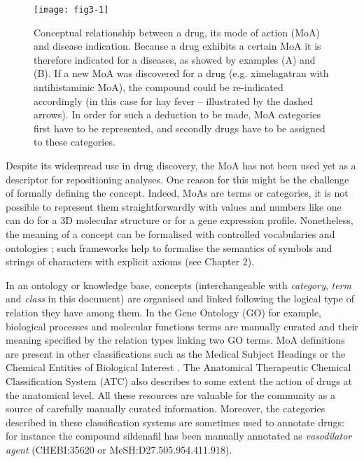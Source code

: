 \begin{figure}[ht]
    \centering
    \texttt{[image: fig3-1]}
    \caption{Conceptual relationship between a drug, its mode of action (MoA) and disease indication. Because a drug exhibits a certain MoA it is therefore indicated for a diseases, as showed by examples (A) and (B). If a new MoA was discovered for a drug (e.g. ximelagatran with antihistaminic MoA), the compound could be re-indicated accordingly (in this case for hay fever – illustrated by the dashed arrows). In order for such a deduction to be made, MoA categories first have to be represented, and secondly drugs have to be assigned to these categories.}
    \label{fig3-1}
\end{figure}

Despite its widespread use in drug discovery, the MoA has not been used yet as a descriptor for repositioning analyses. One reason for this might be the challenge of formally defining the concept. Indeed, MoAs are terms or categories, it is not possible to represent them straightforwardly with values and numbers like one can do for a 3D molecular structure or for a gene expression profile. Nonetheless, the meaning of a concept can be formalised with controlled vocabularies and ontologies \citep{gruber2009encyclopedia}; such frameworks help to formalise the semantics of symbols and strings of characters with explicit axioms (see Chapter 2). 

In an ontology or knowledge base, concepts (interchangeable with \emph{category}, \emph{term} and \emph{class} in this document) are organised and linked following the logical type of relation they have among them. In the Gene Ontology (GO) for example, biological processes and molecular functions terms are manually curated  and their meaning specified by the relation types linking two GO terms. MoA definitions are present in other classifications such as the Medical Subject Headings \citep{nelson2004mesh} or the Chemical Entities of Biological Interest \citep{hastings2013chebi}. The Anatomical Therapeutic Chemical Classification System (ATC) \citep{world2006anatomical} also describes to some extent the action of drugs at the anatomical level. All these resources are valuable for the community as a source of carefully manually curated information. Moreover, the categories described in these classification systems are sometimes used to annotate drugs: for instance the compound sildenafil has been manually annotated as \emph{vasodilator agent} (CHEBI:35620 or MeSH:D27.505.954.411.918).

